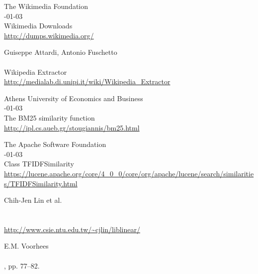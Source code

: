 \documentclass[11pt,letterpaper]{article}
\begin{document}
\begin{thebibliography}{}
The Wikimedia Foundation \\
-01-03 \\
\newblock Wikimedia Downloads \\
\newblock \url{http://dumps.wikimedia.org/} 

Guiseppe Attardi, Antonio Fuschetto \\
 \\
\newblock Wikipedia Extractor \\
\newblock \url{http://medialab.di.unipi.it/wiki/Wikipedia_Extractor} 

Athens University of Economics and Business \\
-01-03 \\
\newblock The BM25 similarity function \\
\newblock \url{http://ipl.cs.aueb.gr/stougiannis/bm25.html} 

The Apache Software Foundation \\
-01-03 \\
\newblock Class TFIDFSimilarity \\
\newblock \url{https://lucene.apache.org/core/4_0_0/core/org/apache/lucene/search/similarities/TFIDFSimilarity.html}

Chih-Jen Lin et al. \\
 \\
 \\
\newblock \url{http://www.csie.ntu.edu.tw/~cjlin/liblinear/}

E.M. Voorhees \\
 \\
, pp. 77--82.


\end{thebibliography}
\end{document}
